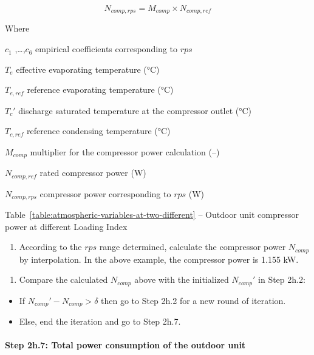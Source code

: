 \begin{equation}
  N_{comp,rps} = M_{comp} \times N_{comp,ref}
\end{equation}

Where

\(c_1\) ,\ldots{},\(c_6\) empirical coefficients corresponding to \(rps\)

\(T_e\) effective evaporating temperature (°C)

\(T_{e,ref}\) reference evaporating temperature (°C)

\({T_c}'\) discharge saturated temperature at the compressor outlet (°C)

\(T_{c,ref}\) reference condensing temperature (°C)

\(M_{comp}\) multiplier for the compressor power calculation (--)

\(N_{comp,ref}\) rated compressor power (W)

\(N_{comp,rps}\) compressor power corresponding to \(rps\) (W)

Table~\ref{table:atmospheric-variables-at-two-different} -- Outdoor unit compressor power at different Loading Index



\begin{enumerate}
\def\labelenumi{\alph{enumi}.}
\setcounter{enumi}{1}
\tightlist
\item
  According to the \(rps\) range determined, calculate the compressor power \(N_{comp}\) by interpolation. In the above example, the compressor power is 1.155 kW. 
\end{enumerate}

\begin{enumerate}
\def\labelenumi{(\arabic{enumi})}
\setcounter{enumi}{1}
\tightlist
\item
  Compare the calculated \(N_{comp}\) above with the initialized \({N_{comp}}'\) in Step 2h.2:
\end{enumerate}

\begin{itemize}
\item
  If \({N_{comp}}'-N_{comp}>\delta\) then go to Step 2h.2 for a new round of iteration.
\item
  Else, end the iteration and go to Step 2h.7.
\end{itemize}

\paragraph{Step 2h.7: Total power consumption of the outdoor unit}\label{step-2h.7-total-power-consumption-of-the-outdoor-unit}

